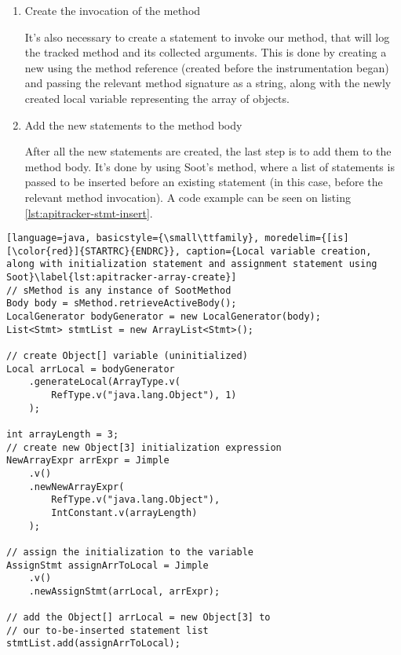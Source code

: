 \begin{enumerate}
\begin{enumerate}
        After we're sure that the class implements the  method, a new invoke expression statement is created, along with the assignment statement for the created variable. The boxed value is now ready to be inserted into our array of objects, and this is also done by creating a new Soot statement.
    \end{enumerate}

    \item Create the invocation of the  method

    It's also necessary to create a statement to invoke our  method, that will log the tracked method and its collected arguments. This is done by creating a new  using the  method reference (created before the instrumentation began) and passing the relevant method signature as a string, along with the newly created local variable representing the array of objects.

    \item Add the new statements to the method body

    After all the new statements are created, the last step is to add them to the method body. It's done by using Soot's  method, where a list of statements is passed to be inserted before an existing statement (in this case, before the relevant method invocation). A code example can be seen on listing \ref{lst:apitracker-stmt-insert}.
\end{enumerate}

\begin{lstlisting}[language=java, basicstyle={\small\ttfamily}, moredelim={[is][\color{red}]{STARTRC}{ENDRC}}, caption={Local variable creation, along with initialization statement and assignment statement using Soot}\label{lst:apitracker-array-create}]
// sMethod is any instance of SootMethod
Body body = sMethod.retrieveActiveBody();
LocalGenerator bodyGenerator = new LocalGenerator(body);
List<Stmt> stmtList = new ArrayList<Stmt>();

// create Object[] variable (uninitialized)
Local arrLocal = bodyGenerator
    .generateLocal(ArrayType.v(
        RefType.v("java.lang.Object"), 1)
    );

int arrayLength = 3;
// create new Object[3] initialization expression
NewArrayExpr arrExpr = Jimple
    .v()
    .newNewArrayExpr(
        RefType.v("java.lang.Object"), 
        IntConstant.v(arrayLength)
    );

// assign the initialization to the variable
AssignStmt assignArrToLocal = Jimple
    .v()
    .newAssignStmt(arrLocal, arrExpr);

// add the Object[] arrLocal = new Object[3] to
// our to-be-inserted statement list
stmtList.add(assignArrToLocal);
\end{lstlisting}

